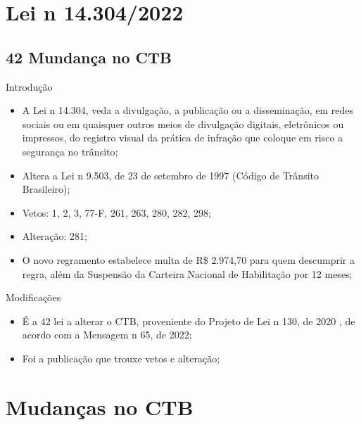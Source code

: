 \documentclass{beamer}
\begin{document}
\section{Lei n 14.304/2022}
\subsection{42 Mundança no CTB}
\begin{frame}{Introdução}
    \begin{itemize}
        \item \justifying A Lei n 14.304, veda a divulgação, a publicação ou a disseminação, em redes sociais ou em quaisquer outros meios de divulgação digitais, eletrônicos ou impressos, do registro visual da prática de infração que coloque em risco a segurança no trânsito;
        \item \justifying Altera a Lei n 9.503, de 23 de setembro de 1997 (Código de Trânsito Brasileiro);
        \item  Vetos: 1, 2, 3, 77-F, 261, 263, 280, 282, 298; 
        \item  Alteração: 281;
        \item  \justifying O novo regramento estabelece multa de R\$ 2.974,70 para quem descumprir a regra, além da Suspensão da Carteira Nacional de Habilitação por 12 meses;
    \end{itemize}
\end{frame}

\begin{frame}{Modificações}
    \begin{itemize}
        \item \justifying É a 42 lei a alterar o CTB, proveniente do Projeto de Lei n 130, de 2020 , de acordo com a Mensagem n 65, de 2022;
        \item Foi a publicação que trouxe vetos e alteração;
    \end{itemize}
\end{frame}


\section{Mudanças no CTB}
\end{document}

